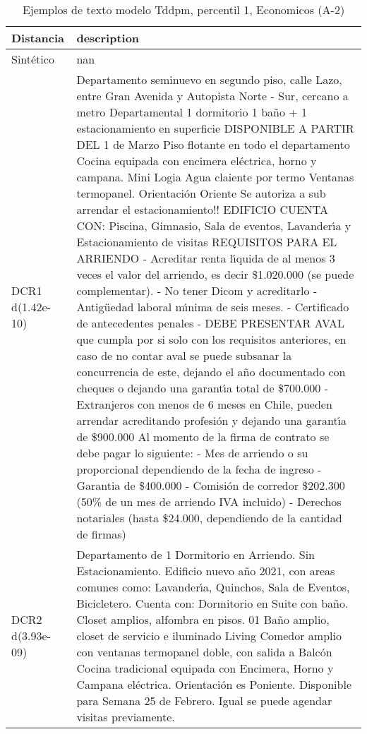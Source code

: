\begin{table}[H]
\centering
\fontsize{10}{14}\selectfont
\caption{Ejemplos de texto modelo Tddpm, percentil 1, Economicos (A-2)}
\label{table-example-economicos-a-2-tddpm_mlp-1p-text}
\begin{tabular}{|l|m{35em}|}
\hline
\rowcolor[gray]{0.8}
Distancia & description \\
\hline Sintético & nan \\
\hline DCR1 d(1.42e-10) & Departamento seminuevo en segundo piso, calle Lazo, entre Gran Avenida y Autopista Norte - Sur, cercano a metro Departamental 1 dormitorio 1 ba\~no + 1 estacionamiento en superficie DISPONIBLE A PARTIR DEL 1 de Marzo Piso flotante en todo el departamento Cocina equipada con encimera el\'ectrica, horno y campana. Mini Logia Agua claiente por termo Ventanas termopanel. Orientaci\'on Oriente Se autoriza a sub arrendar el estacionamiento!!  EDIFICIO CUENTA CON:  Piscina, Gimnasio, Sala de eventos, Lavander{\'\i}a y Estacionamiento de visitas  REQUISITOS PARA EL ARRIENDO - Acreditar renta l{\'\i}quida de al menos 3 veces el valor del arriendo, es decir \$1.020.000 (se puede complementar). - No tener Dicom y acreditarlo  - Antig\"uedad laboral m{\'\i}nima de seis meses. - Certificado de antecedentes penales  - DEBE PRESENTAR AVAL que cumpla por si solo con los requisitos anteriores, en caso de no contar aval se puede subsanar la concurrencia de este, dejando el a\~no documentado con cheques o dejando una garant{\'\i}a total de \$700.000  -Extranjeros con menos de 6 meses en Chile, pueden arrendar acreditando profesi\'on y dejando una garant{\'\i}a de \$900.000  Al momento de la firma de contrato se debe pagar lo siguiente:  - Mes de arriendo o su proporcional dependiendo de la fecha de ingreso  - Garantia de \$400.000 - Comisi\'on de corredor \$202.300 (50\% de un mes de arriendo IVA incluido) - Derechos notariales (hasta \$24.000, dependiendo de la cantidad de firmas) \\
\hline DCR2 d(3.93e-09) & Departamento de 1 Dormitorio en Arriendo. Sin Estacionamiento.  Edificio nuevo a\~no 2021, con areas comunes como: Lavander{\'\i}a, Quinchos, Sala de Eventos, Bicicletero.
  Cuenta con:  Dormitorio en Suite con ba\~no. Closet amplios, alfombra en pisos.  01 Ba\~no amplio, closet de servicio e iluminado  Living Comedor amplio con ventanas termopanel doble, con salida a Balc\'on Cocina tradicional equipada con Encimera, Horno y Campana el\'ectrica.  Orientaci\'on es Poniente.   Disponible para Semana 25 de Febrero. Igual se puede agendar visitas previamente. \\
\hline
\end{tabular}
\end{table}
